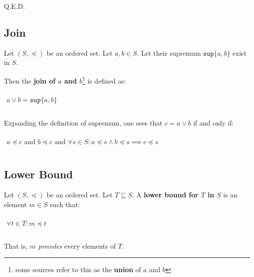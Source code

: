 Q.E.D.


\subsection{Join}
\label{sec:join}

Let $(S, \preceq)$ be an ordered set. Let $a, b \in S$. Let their
supremum $\mathtt{sup} \{a, b\}$ exist in $S$.

Then the \textbf{join of $a$ and $b$}\footnote{some sources refer to
  this as the \textbf{union} of $a$ and $b$} is defined as:

\begin{math}
  \begin{array}{c}
    \\
    a \vee b = \mathtt{sup} \{ a, b \}\\
    \\
  \end{array}
\end{math}

Expanding the definition of supremum, one sees that $c = a \vee b$ if
and only if:

\begin{math}
  \begin{array}{c}
    \\
    a \preceq c\text{ and }b \preceq c\text{ and }\forall s \in S: a \preceq s \land b \preceq s \implies c \preceq s\\
    \\
  \end{array}
\end{math}



\subsection{Lower Bound}
\label{sec:lower-bound}

Let $(S, \preceq)$ be an ordered set. Let $T \subseteq S$. A
\textbf{lower bound for $T$ in $S$} is an element $m \in S$ such that:

\begin{math}
  \begin{array}{c}
    \\
    \forall t \in T: m \preceq t\\
    \\
  \end{array}
\end{math}

That is, $m$ \textit{precedes} every elements of $T$.



